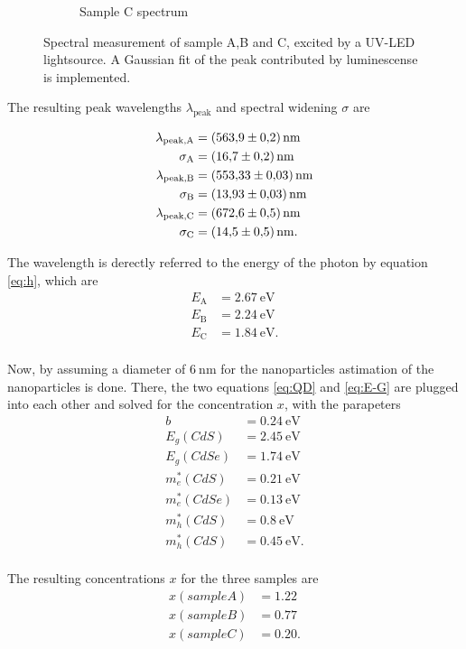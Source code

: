 \begin{figure}
\begin{subfigure}{.3\textwidth}
  \caption{Sample C spectrum}
    \label{fig:Samp_C_D}
\end{subfigure}
\caption{Spectral measurement of sample A,B and C, excited by a UV-LED lightsource. A Gaussian fit of the peak contributed by luminescense is implemented.}
\end{figure}

The resulting peak wavelengths $\lambda_\text{peak}$ and spectral widening $\sigma$ are

\begin{align*}
    \lambda_\text{peak,A} &= \SI{563.9 \pm 0.2}{\nano\meter} \\
    \sigma_\text{A} &= \SI{16.7 \pm 0.2}{\nano\meter} \\
    \lambda_\text{peak,B} &= \SI{553.33 \pm 0.03}{\nano\meter} \\
    \sigma_\text{B} &= \SI{13.93 \pm 0.03}{\nano\meter} \\
    \lambda_\text{peak,C} &= \SI{672.6 \pm 0.5}{\nano\meter} \\
    \sigma_\text{C} &= \SI{14.5 \pm 0.5}{\nano\meter}. \\
\end{align*}

The wavelength is derectly referred to the energy of the photon by equation \ref{eq:h}, which are 
\begin{align*}
    E_\text{A} &= \SI{2.67}{\eV} \\
    E_\text{B} &= \SI{2.24}{\eV} \\
    E_\text{C} &= \SI{1.84}{\eV}. \\
\end{align*}

Now, by assuming a diameter of $\SI{6}{\nano\meter}$ for the nanoparticles astimation of the nanoparticles is done.
There, the two equations \ref{eq:QD} and \ref{eq:E-G} are plugged into each other and solved for the concentration $x$, with the parapeters
\begin{align*}
    b          &= \SI{0.24}{\eV}\\
    E_g(CdS)   &= \SI{2.45}{\eV}\\
    E_g(CdSe)  &= \SI{1.74}{\eV}\\
    m^*_e(CdS) &= \SI{0.21}{\eV}\\
    m^*_e(CdSe)&= \SI{0.13}{\eV}\\
    m^*_h(CdS) &= \SI{0.8}{\eV}\\
    m^*_h(CdS) &= \SI{0.45}{\eV}.\\
\end{align*}

The resulting concentrations $x$ for the three samples are
\begin{align*}
    x(sample A) &= \num{1.22}\\
    x(sample B) &= \num{0.77}\\
    x(sample C) &= \num{0.20}.\\
\end{align*}